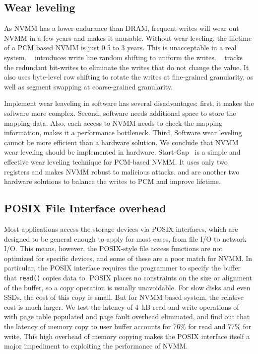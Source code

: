 \subsection{Wear leveling}
\label{sec:wear}
As NVMM has a lower endurance than DRAM, frequent writes will wear out
NVMM in a few years and makes it unusable. Without wear leveling, the lifetime
of a PCM based NVMM is just 0.5 to 3 years. This is unacceptable in a real
system. ~\cite{PCMHierarchy} introduces write line random shifting to uniform
the writes. ~\cite{PCM_EfficientMainMemory} tracks the redundant bit-writes to
eliminate the writes that do not change the value. It also uses byte-level row
shifting to rotate the writes at fine-grained granularity, as well as segment
swapping at coarse-grained granularity.

Implement wear leaveling in software has several disadvantages: first, it makes
the software more complex. Second, software needs additional space to store
the mapping data.
Also, each access to NVMM needs to check the mapping information, makes it
a performance bottleneck.
Third, Software wear leveling cannot be more efficient
than a hardware solution. We conclude that NVMM wear leveling should be
implemented in hardware. Start-Gap~\cite{startgap1} is a simple and effective
wear leveling technique for PCM-based NVMM. It uses only two registers and
makes NVMM robust to malicious attacks. \cite{secrefresh} and \cite{freep}
are another two hardware solutions to balance the writes to PCM and improve
lifetime.

\subsection{POSIX File Interface overhead}
\label{sec:noposix}

Most applications access the storage devices via POSIX interfaces, which are
designed to be general enough to apply for most cases, from file I/O
to network I/O.
This means, however, the POSIX-style file access functions are not optimized
for specific devices, and some of these are a poor match for NVMM.
In particular, the POSIX interface
requires the programmer to specify the buffer that \texttt{read()} copies data
to. POSIX places no constraints on the size
or alignment of the buffer, so a copy operation is usually unavoidable.  For
slow disks and even SSDs, the cost of this copy is small.
But for NVMM based system, the relative cost is much larger.
We test the latency of 4~kB read and
write operations of \DAChell{} with page table populated and page fault overhead
eliminated, and find out that the latency of memory copy to user buffer
accounts for 76\% for read and 77\% for write.
This high overhead of memory copying makes the POSIX interface
itself a major impediment to exploiting the performance of NVMM.

